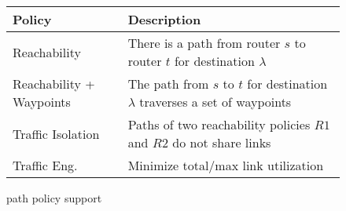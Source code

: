 \begin{figure}
\vspace{-2mm}
\small
\begin{minipage}{\linewidth}
	\begin{tabular}{m{5.8em}  m{14em} } 
		{\bf Policy} & {\bf Description} \\ 
		\hline
		Reachability & There is a path from router $s$ to router $t$ for destination $\lambda$ \\ \hline
		Reachability + \newline Waypoints & The path  from $s$ to $t$ for destination $\lambda$ 
		traverses a set of waypoints\\ \hline
		Traffic \newline Isolation & Paths of two reachability policies $R1$ and $R2$ do not share  links \\ \hline
		Traffic  Eng.  & Minimize total/max link utilization \\
	\end{tabular}
	\end{minipage}
	\vspace{-1mm}
\caption{\name path policy support}
	\label{tab:policysupport}
\end{figure}